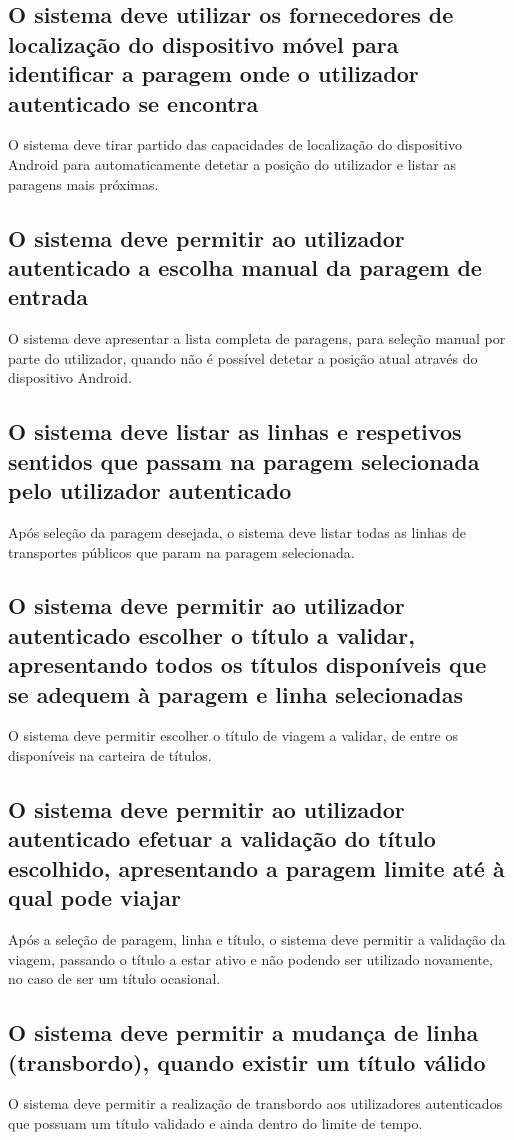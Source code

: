\subsection{O sistema deve utilizar os fornecedores de localização do dispositivo móvel para identificar a paragem onde o utilizador autenticado se encontra}
O sistema deve tirar partido das capacidades de localização do dispositivo Android para automaticamente detetar a posição do utilizador e listar as paragens mais próximas.

\subsection{O sistema deve permitir ao utilizador autenticado a escolha manual da paragem de entrada}
O sistema deve apresentar a lista completa de paragens, para seleção manual por parte do utilizador, quando não é possível detetar a posição atual através do dispositivo Android.

\subsection{O sistema deve listar as linhas e respetivos sentidos que passam na paragem selecionada pelo utilizador autenticado}
Após seleção da paragem desejada, o sistema deve listar todas as linhas de transportes públicos que param na paragem selecionada.

\subsection{O sistema deve permitir ao utilizador autenticado escolher o título a validar, apresentando todos os títulos disponíveis que se adequem à paragem e linha selecionadas}
O sistema deve permitir escolher o título de viagem a validar, de entre os disponíveis na carteira de títulos.

\subsection{O sistema deve permitir ao utilizador autenticado efetuar a validação do título escolhido, apresentando a paragem limite até à qual pode viajar}
Após a seleção de paragem, linha e título, o sistema deve permitir a validação da viagem, passando o título a estar ativo e não podendo ser utilizado novamente, no caso de ser um título ocasional.

\subsection{O sistema deve permitir a mudança de linha (transbordo), quando existir um título válido}
O sistema deve permitir a realização de transbordo aos utilizadores autenticados que possuam um título validado e ainda dentro do limite de tempo.

